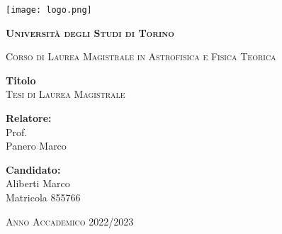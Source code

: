 \thispagestyle{empty}
\begin{center}
    \texttt{[image: logo.png]}
    \vspace{0.5cm}\\
    {\bfseries\scshape\LARGE Università degli Studi di Torino \par}
	\vspace{0,3cm}
	{\scshape\large Corso di Laurea Magistrale in Astrofisica e Fisica Teorica\par}
    \vspace{2cm}
	{\LARGE\bfseries Titolo}
	\vspace{0.3cm}\\
    {\scshape\Large Tesi di Laurea Magistrale}
	\vspace{0,5cm}
\end{center}
\vspace{2cm}
\begin{minipage}[t]{0.4\textwidth} %
    {\large{{\bf Relatore:}\\
        Prof.\\
        Panero Marco}}
\end{minipage}
\hfill
\begin{minipage}[t]{0.47\textwidth}\raggedleft %
    {\large{{\bf Candidato:}\\
        Aliberti Marco\\
        Matricola 855766}}
    \vspace{12mm}
\end{minipage}
\hfill
\vspace{18mm}
\begin{center} %
    \large{\scshape Anno Accademico 2022/2023}
\end{center} 
